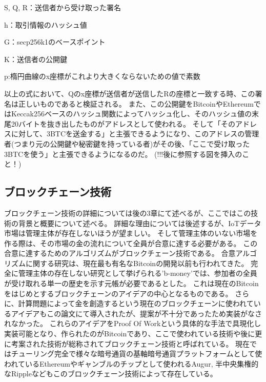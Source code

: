 \begin{list}{}{}
\item S, Q, R：送信者から受け取った署名
\item h：取引情報のハッシュ値
\item G：secp256k1のベースポイント
\item K：送信者の公開鍵
\item p:楕円曲線のx座標がこれより大きくならないための値で素数
\end{list}

以上の式において、Qのx座標が送信者が送信したRの座標と一致する時、この署名は正しいものであると検証される。
また、この公開鍵をBitcoinやEthereumではKeccak256ベースのハッシュ関数によってハッシュ化し、そのハッシュ値の末尾20バイトを抜き出したものがアドレスとして使われる。
そして「そのアドレスに対して、3BTCを送金する」と主張できるようになり、このアドレスの管理者(つまり元の公開鍵や秘密鍵を持っている者)がその後、「ここで受け取った3BTCを使う」と主張できるようになるのだ。
(!!!後に参照する図を挿入のこと！)

\subsection{ブロックチェーン技術}
ブロックチェーン技術の詳細については後の3章にて述べるが、ここではこの技術の背景と概要について述べる。
詳細な理由については後述するが、IoTデータ市場は管理主体が存在しないほうが望ましい。
そして管理主体のいない市場を作る際は、その市場の金の流れについて全員が合意に達する必要がある。
この合意に達するためのアルゴリズムがブロックチェーン技術である。
合意アルゴリズムに関する研究は、現在最も有名なBitcoin\cite{Bitcoin}の開発以前も行われてきた。
完全に管理主体の存在しない研究として挙げられる'b-money'\cite{b-money}では、参加者の全員が受け取れる単一の歴史を示す元帳が必要であるとした。
これは現在のBitcoinをはじめとするブロックチェーンのアイデアの中心となるものである。
さらに、計算問題によって金を創造するという現在のブロックチェーンに使われているアイデアもこの論文にて導入されたが、提案が不十分であったため実装がなされなかった。
これらのアイデアをProof Of Workという具体的な手法で具現化し実装可能となり、作られたのがBitcoinであり、ここで使われている技術や後に更に考案された技術が総称されてブロックチェーン技術と呼ばれている。
現在ではチューリング完全で様々な暗号通貨の基軸暗号通貨プラットフォームとして使われているEthereum\cite{ethereum}やギャンブルのチップとして使われるAugur\cite{Augur}, 半中央集権的なRipple\cite{Ripple}などもこのブロックチェーン技術によって存在している。


